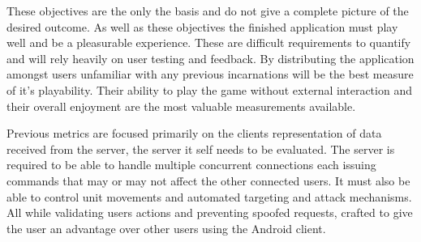 These objectives are the only the basis and do not give a complete picture of the desired outcome. As well as these objectives the finished application must play well and be a pleasurable experience. These are difficult requirements to quantify and will rely heavily on user testing and feedback. By distributing the application amongst users unfamiliar with any previous incarnations will be the best measure of it's playability. Their ability to play the game without external interaction and their overall enjoyment are the most valuable measurements available.

Previous metrics are focused primarily on the clients representation of data received from the server, the server it self needs to be evaluated. The server is required to be able to handle multiple concurrent connections each issuing commands that may or may not affect the other connected users. It must also be able to control unit movements and automated targeting and attack mechanisms. All while validating users actions and preventing spoofed requests, crafted to give the user an advantage over other users using the Android client.
